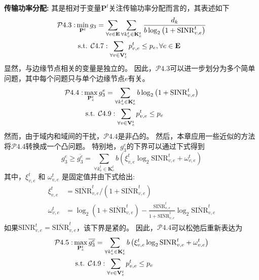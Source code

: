 \textbf{传输功率分配:} 其是相对于变量$\mathbf{P}^{t}$关注传输功率分配而言的，其表述如下
\begin{align}
	\mathcal{P}4.3: &\min_{\mathbf{P}^{t}} g_3= \sum_{ \forall e \in \mathbf{E}} \sum_{\forall k_{v}^{t} \in \mathbf{K}_{e}^{t}}  \frac{d_{k}}{b  \log _{2}\left(1+\mathrm{SINR}_{v, e}^t\right)} \notag \\
	&\text { s.t. } \mathcal{C}4.7: \sum_{\forall v \in \mathbf{V}_{e}^{t}} p_{v, e}^{t} \leq p_{e}, \forall e \in \mathbf{E}
\end{align}
显然，与边缘节点相关的变量是独立的。
因此，$\mathcal{P}4.3$可以进一步划分为多个简单问题，其中每个问题只与单个边缘节点$e$有关。
\begin{align}
	\mathcal{P}4.4: & \max_{\mathbf{P}_{e}^{t}}  g_3^e= \sum_{\forall k_{v}^{t} \in \mathbf{K}_{e}^{t}} {b  \log _{2}\left(1+\mathrm{SINR}_{v, e}^t\right)} \notag \\
	&\text { s.t. } \mathcal{C}4.9: \sum_{\forall v \in \mathbf{V}_{e}^{t}} p_{v, e}^{t} \leq p_{e}  
\end{align}
然而，由于域内和域间的干扰，$\mathcal{P}4.4$是非凸的。
然后，本章应用一些近似的方法将$\mathcal{P}4.4$转换成一个凸问题。
特别地，$g_3^e$的下界可以通过下式得到\cite{papandriopoulos2006low}
\begin{equation}
	g_3^e \geq \overline{g_3^e} = \sum_{\forall k_{v}^{t} \in \mathbf{K}_{e}^{t}} {b \left( \xi_{v, e}^{t} \log _{2}\mathrm{SINR}_{v, e}^t + \omega_{v, e}^{t} \right) }
\end{equation}
其中，$\xi_{v, e}^{t}$ 和 $\omega_{v, e}^{t}$ 是固定值并由下式给出:
\begin{align}
	\xi_{v, e}^{t} &= \overline{\mathrm{SINR}}_{v, e}^t \bigg/ ( 1 + \overline{\mathrm{SINR}}_{v, e}^t ) \\
	\omega_{v, e}^{t} &= \log _{2} (1+ \overline{\mathrm{SINR}}_{v, e}^t) - \frac{\overline{\mathrm{SINR}}_{v, e}^t}{1 + \overline{\mathrm{SINR}}_{v, e}^t} \log _{2}\overline{\mathrm{SINR}}_{v, e}^t
\end{align}
如果${\mathrm{SINR}}_{v, e}^t =\overline{\mathrm{SINR}}_{v, e}^t$，该下界是紧的。
因此，$\mathcal{P}4.4$可以松弛后重新表达为
\begin{align}
	\mathcal{P}4.5: & \max_{\mathbf{P}_{e}^{t}}  \overline{g_3^e}= \sum_{\forall k_{v}^{t} \in \mathbf{K}_{e}^{t}} {b \left( \xi_{v, e}^{t} \log _{2}\mathrm{SINR}_{v, e}^t + \omega_{v, e}^{t} \right) } \notag \\
	&\text { s.t. } \mathcal{C}4.9: \sum_{\forall v \in \mathbf{V}_{e}^{t}} p_{v, e}^{t} \leq p_{e}  
\end{align}
